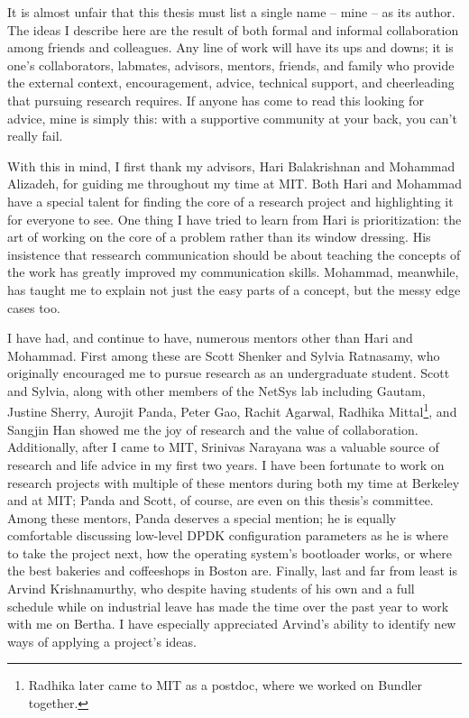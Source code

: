 It is almost unfair that this thesis must list a single name -- \ie mine -- as its author. The ideas I describe here are the result of both formal and informal collaboration among friends and colleagues.
Any line of work will have its ups and downs; it is one's collaborators, labmates, advisors, mentors, friends, and family who provide the external context, encouragement, advice, technical support, and cheerleading that pursuing research requires. 
If anyone has come to read this looking for advice, mine is simply this: with a supportive community at your back, you can't really fail.

With this in mind, I first thank my advisors, Hari Balakrishnan and Mohammad Alizadeh, for guiding me throughout my time at MIT. Both Hari and Mohammad have a special talent for finding the core of a research project and highlighting it for everyone to see. 
One thing I have tried to learn from Hari is prioritization: the art of working on the core of a problem rather than its window dressing.
His insistence that ressearch communication should be about teaching the concepts of the work has greatly improved my communication skills.
Mohammad, meanwhile, has taught me to explain not just the easy parts of a concept, but the messy edge cases too.

I have had, and continue to have, numerous mentors other than Hari and Mohammad. First among these are Scott Shenker and Sylvia Ratnasamy, who originally encouraged me to pursue research as an undergraduate student. Scott and Sylvia, along with other members of the NetSys lab including Gautam, Justine Sherry, Aurojit Panda, Peter Gao, Rachit Agarwal, Radhika Mittal\footnote{Radhika later came to MIT as a postdoc, where we worked on Bundler together.}, and Sangjin Han showed me the joy of research and the value of collaboration. 
Additionally, after I came to MIT, Srinivas Narayana was a valuable source of research and life advice in my first two years.
I have been fortunate to work on research projects with multiple of these mentors during both my time at Berkeley and at MIT; Panda and Scott, of course, are even on this thesis's committee.
Among these mentors, Panda deserves a special mention; he is equally comfortable discussing low-level DPDK configuration parameters as he is where to take the project next, how the operating system's bootloader works, or where the best bakeries and coffeeshops in Boston are.
Finally, last and far from least is Arvind Krishnamurthy, who despite having students of his own and a full schedule while on industrial leave has made the time over the past year to work with me on Bertha. I have especially appreciated Arvind's ability to identify new ways of applying a project's ideas.

